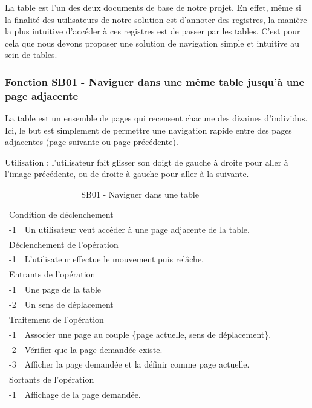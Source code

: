\documentclass[a4paper]{article}
\begin{document}
La table est l'un des deux documents de base de notre projet. En effet, même si la finalité des utilisateurs de notre solution est d'annoter des registres, la manière la plus intuitive d'accéder à ces registres est de passer par les tables. C'est pour cela que nous devons proposer une solution de navigation simple et intuitive au sein de tables.

\subsubsection{Fonction SB01 - Naviguer dans une même table jusqu'à une page adjacente}

La table est un ensemble de pages qui recensent chacune des dizaines d'individus. Ici, le but est simplement de permettre une navigation rapide entre des pages adjacentes (page suivante ou page pr\'ec\'edente).

Utilisation : l'utilisateur fait glisser son doigt de gauche \`a droite pour aller \`a l'image pr\'ec\'edente, ou de droite \`a gauche pour aller \`a la suivante.

\begin{table}[H]
  \centering
   \small
	\begin{tabular}{|c|p{12cm}|}
   		\hline
   			\rowcolor{lightgray}\multicolumn{2}{|c|}{\textbf{SB01 - Naviguer dans une m\^eme table jusqu'à une page adjacente}} \\
   		\hline
   			\multicolumn{2}{|l|}{Condition de d\'eclenchement} \\
   		\hline
   		-1 & Un utilisateur veut acc\'eder \`a une page adjacente de la table. \\
   		\hline
   			\multicolumn{2}{|l|}{D\'eclenchement de l'op\'eration} \\
   		\hline
   			-1 & L'utilisateur effectue le mouvement puis rel\^ache. \\
   		\hline
   			\multicolumn{2}{|l|}{Entrants de l'op\'eration} \\
   		\hline
   			-1 & Une page de la table \\
        	-2 & Un sens de d\'eplacement \\ 
   		\hline
   			\multicolumn{2}{|l|}{Traitement de l'op\'eration} \\
  		\hline
   			-1 & Associer une page au couple \{page actuelle, sens de d\'eplacement\}.  \\
        	-2 & V\'erifier que la page demand\'ee existe. \\
        	-3 & Afficher la page demand\'ee et la d\'efinir comme page actuelle. \\
   		\hline
   			\multicolumn{2}{|l|}{Sortants de l'op\'eration} \\
   		\hline
   			-1 & Affichage de la page demand\'ee. \\
   		\hline
	\end{tabular}
  \caption{SB01 - Naviguer dans une table}
  \normalsize
  \label{tab:naviguer_table_unique_adjacent}
\end{table}
\end{document}
